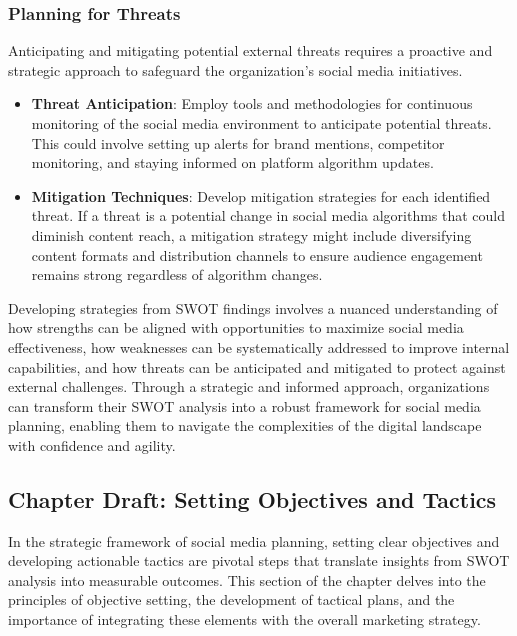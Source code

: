 \documentclass[
]{book}
\providecommand{\tightlist}{%
  \setlength{\itemsep}{0pt}\setlength{\parskip}{0pt}}
\begin{document}
\hypertarget{planning-for-threats}{%
\subsubsection{Planning for Threats}\label{planning-for-threats}}

Anticipating and mitigating potential external threats requires a proactive and strategic approach to safeguard the organization's social media initiatives.

\begin{itemize}
\tightlist
\item
  \textbf{Threat Anticipation}: Employ tools and methodologies for continuous monitoring of the social media environment to anticipate potential threats. This could involve setting up alerts for brand mentions, competitor monitoring, and staying informed on platform algorithm updates.
\item
  \textbf{Mitigation Techniques}: Develop mitigation strategies for each identified threat. If a threat is a potential change in social media algorithms that could diminish content reach, a mitigation strategy might include diversifying content formats and distribution channels to ensure audience engagement remains strong regardless of algorithm changes.
\end{itemize}

Developing strategies from SWOT findings involves a nuanced understanding of how strengths can be aligned with opportunities to maximize social media effectiveness, how weaknesses can be systematically addressed to improve internal capabilities, and how threats can be anticipated and mitigated to protect against external challenges. Through a strategic and informed approach, organizations can transform their SWOT analysis into a robust framework for social media planning, enabling them to navigate the complexities of the digital landscape with confidence and agility.

\hypertarget{chapter-draft-setting-objectives-and-tactics}{%
\subsection{Chapter Draft: Setting Objectives and Tactics}\label{chapter-draft-setting-objectives-and-tactics}}

In the strategic framework of social media planning, setting clear objectives and developing actionable tactics are pivotal steps that translate insights from SWOT analysis into measurable outcomes. This section of the chapter delves into the principles of objective setting, the development of tactical plans, and the importance of integrating these elements with the overall marketing strategy.
\end{document}
